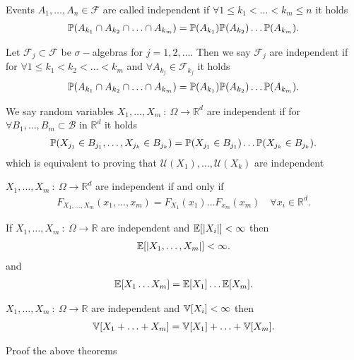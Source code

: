 \begin{definition}
  Events $A_{1},\ldots ,A_{n} \in  \mathcal{F}$ are called independent if $\forall 1 \le k_{1} < \ldots  < k_m \le  n$ it holds 
  \begin{align*}
    \P(A_{k_{1}}\cap A_{k_2} \cap \ldots \cap A_{k_m} )=\P(A_{k_{1}})\P(A_{k_{2}})\ldots \P(A_{k_m})
  .\end{align*}
\end{definition}
\begin{definition}
 Let $\mathcal{F}_j \subset  \mathcal{F}$   be $\sigma-$algebras for $j=1,2,\ldots $. Then we say $\mathcal{F}_j$ are independent if 
 for $\forall 1 \le k_{1}<k_{2}<\ldots <k_m$ and $\forall A_{k_j} \in  \mathcal{F}_{k_j}$ it holds
 \begin{align*}
  \P(A_{k_{1}}\cap A_{k_2} \cap \ldots \cap A_{k_m} )=\P(A_{k_{1}})\P(A_{k_{2}})\ldots \P(A_{k_m})
 .\end{align*}
\end{definition}
\begin{definition}
 We say random variables $X_{1},\ldots ,X_m \ : \ \Omega  \to \mathbb{R}^{d} $  are independent if 
 for $\forall  B_{1},\ldots ,B_{m} \subset  \mathcal{B}$ in $\mathbb{R}^{d} $ it holds 
 \begin{align*}
   \P(X_{j_{1}}\in B_{j_{1}},\ldots, X_{j_k}\in B_{j_k} ) = \P(X_{j_{1}} \in  B_{j_{1}})\ldots \P(X_{j_k} \in  B_{j_k})
 .\end{align*}
 which is equivalent to proving that $\mathcal{U}(X_{1}),\ldots ,\mathcal{U}(X_k)$ are independent
\end{definition}
\begin{theorem}
 $X_{1},\ldots ,X_m \ : \ \Omega  \to \mathbb{R}^{d} $ are independent if and only if 
 \begin{align*}
   F_{X_{1},\ldots ,X_m}(x_{1},\ldots ,x_m) =F_{X_{1}}(x_{1})\ldots F_{x_m}(x_m) \quad \forall  x_i \in \mathbb{R}^{d} 
 .\end{align*}
\end{theorem}
\newpage
\begin{theorem}
  If $X_{1},\ldots ,X_m \ : \ \Omega  \to \mathbb{R} $ are independent and $\E[\abs{X_i}] < \infty$ then 
  \begin{align*}
    \E[\abs{X_{1},\ldots ,X_m}]<\infty
  .\end{align*}
  and 
  \begin{align*}
    \E[X_{1}\ldots X_m] = \E[X_{1}]\ldots \E[X_m]
  .\end{align*}
\end{theorem}
\begin{theorem}
  $X_{1},\ldots ,X_m \ : \ \Omega  \to \mathbb{R} $ are independent and $\V[X_i] <\infty$ then 
  \begin{align*}
    \V[X_{1} + \ldots  + X_m] = \V[X_{1}] + \ldots  + \V[X_m]
  .\end{align*}
\end{theorem}
\begin{exercise}
 Proof the above theorems
\end{exercise}
